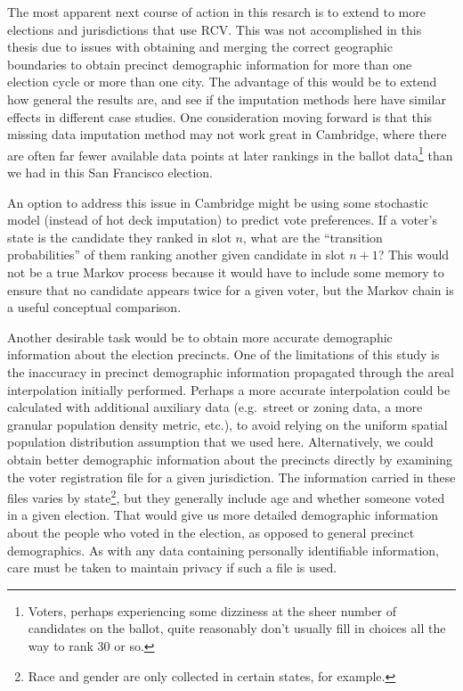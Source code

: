 \documentclass[12pt,twoside]{reedthesis}
\begin{document}
The most apparent next course of action in this resarch is to extend to more elections and jurisdictions that use RCV. This was not accomplished in this thesis due to issues with obtaining and merging the correct geographic boundaries to obtain precinct demographic information for more than one election cycle or more than one city. The advantage of this would be to extend how general the results are, and see if the imputation methods here have similar effects in different case studies. One consideration moving forward is that this missing data imputation method may not work great in Cambridge, where there are often far fewer available data points at later rankings in the ballot data\footnote{Voters, perhaps experiencing some dizziness at the sheer number of candidates on the ballot, quite reasonably don't usually fill in choices all the way to rank 30 or so.} than we had in this San Francisco election.

An option to address this issue in Cambridge might be using some stochastic model (instead of hot deck imputation) to predict vote preferences. If a voter's state is the candidate they ranked in slot \(n\), what are the ``transition probabilities'' of them ranking another given candidate in slot \(n + 1\)? This would not be a true Markov process because it would have to include some memory to ensure that no candidate appears twice for a given voter, but the Markov chain is a useful conceptual comparison.

Another desirable task would be to obtain more accurate demographic information about the election precincts. One of the limitations of this study is the inaccuracy in precinct demographic information propagated through the areal interpolation initially performed. Perhaps a more accurate interpolation could be calculated with additional auxiliary data (e.g.~street or zoning data, a more granular population density metric, etc.), to avoid relying on the uniform spatial population distribution assumption that we used here. Alternatively, we could obtain better demographic information about the precincts directly by examining the voter registration file for a given jurisdiction. The information carried in these files varies by state\footnote{Race and gender are only collected in certain states, for example.}, but they generally include age and whether someone voted in a given election. That would give us more detailed demographic information about the people who voted in the election, as opposed to general precinct demographics. As with any data containing personally identifiable information, care must be taken to maintain privacy if such a file is used.
\end{document}
